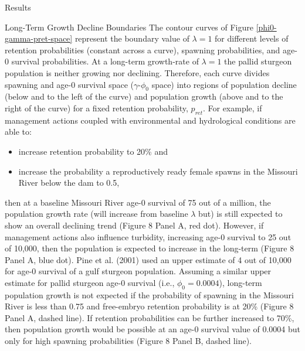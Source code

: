\documentclass[12pt]{article}
\begin{document}
\begin{section}{Results}
\begin{subsection}{Long-Term Growth Decline Boundaries}
The contour curves of Figure \ref{phi0-gamma-pret-space} represent the boundary value of $\lambda=1$ for different levels of retention probabilities (constant across a curve), spawning probabilities, and age-0 survival probabilities.  At a long-term growth-rate of $\lambda=1$ the pallid sturgeon population is neither growing nor declining.  Therefore, each curve divides spawning and age-0 survival space ($\gamma$-$\phi_0$ space) into regions of population decline (below and to the left of the curve) and population growth (above and to the right of the curve) for a fixed retention probability, $p_{ret}$.  For example, if management actions coupled with environmental and hydrological conditions are able to:
\begin{itemize}
\item increase retention probability to 20\% and
\item increase the probability a reproductively ready female spawns in the Missouri River below the dam to 0.5, 
\end{itemize}
then at a baseline Missouri River age-0 survival of 75 out of a million, the population growth rate (will increase from baseline $\lambda$ but) is still expected to show an overall declining trend (Figure 8 Panel A, red dot).  However, if management actions also influence turbidity, increasing age-0 survival to 25 out of 10,000, then the population is expected to increase in the long-term (Figure 8 Panel A, blue dot).  Pine et al. (2001) used an upper estimate of 4 out of 10,000 for age-0 survival of a gulf sturgeon population.  Assuming a similar upper estimate for pallid sturgeon age-0 survival (i.e., $\phi_0=0.0004$), long-term population growth is not expected if the probability of spawning in the Missouri River is less than 0.75 and free-embryo retention probability is at 20\% (Figure 8 Panel A, dashed line). If retention probabilities can be further increased to 70\%, then population growth would be possible at an age-0 survival value of 0.0004  but only for high spawning probabilities (Figure 8 Panel B, dashed line).             
\end{subsection}


\end{section}
\end{document}
